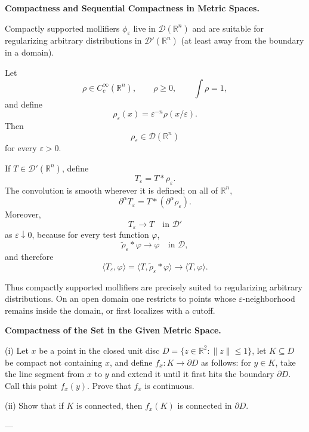 \begin{problem}[CP-II-0062]
\label{prob:cp-ii-0062}
\textbf{Compactness and Sequential Compactness in Metric Spaces.}

\hspace*{1.5em}Compactly supported mollifiers $\phi_\varepsilon$ live in
	$\mathcal{D}(\mathbb{R}^n)$ and are suitable for regularizing
	arbitrary distributions in $\mathcal{D}'(\mathbb{R}^n)$ (at least
	away from the boundary in a domain).
\end{problem}

\begin{solution}
Let
\[
\rho\in C_c^\infty(\mathbb R^n),
\qquad
\rho\ge0,
\qquad
\int\rho=1,
\]
and define
\[
\rho_\varepsilon(x)
=
\varepsilon^{-n}\rho(x/\varepsilon).
\]
Then
\[
\rho_\varepsilon\in\mathcal D(\mathbb R^n)
\]
for every \(\varepsilon>0\).

If \(T\in\mathcal D'(\mathbb R^n)\), define
\[
T_\varepsilon=T*\rho_\varepsilon.
\]
The convolution is smooth wherever it is defined; on all of \(\mathbb R^n\),
\[
\partial^\alpha T_\varepsilon
=
T*(\partial^\alpha\rho_\varepsilon).
\]
Moreover,
\[
T_\varepsilon\longrightarrow T
\quad\text{in }\mathcal D'
\]
as \(\varepsilon\downarrow0\), because for every test function \(\varphi\),
\[
\widetilde\rho_\varepsilon*\varphi
\longrightarrow
\varphi
\quad\text{in }\mathcal D,
\]
and therefore
\[
\langle T_\varepsilon,\varphi\rangle
=
\langle T,\widetilde\rho_\varepsilon*\varphi\rangle
\longrightarrow
\langle T,\varphi\rangle.
\]

Thus compactly supported mollifiers are precisely suited to regularizing arbitrary distributions. On an open domain one restricts to points whose \(\varepsilon\)-neighborhood remains inside the domain, or first localizes with a cutoff.
\end{solution}


\begin{problem}[CP-II-0069]
\label{prob:cp-ii-0069}
\textbf{Compactness of the Set in the Given Metric Space.}

\hspace*{1.5em}(i) Let $x$ be a point in the closed unit disc $D=\{z\in\mathbb{R}^2 : \|z\|\leq 1\}$, let $K\subseteq D$ be compact not containing $x$, and define $f_x:K\to \partial D$ as follows: for $y\in K$, take the line segment from $x$ to $y$ and extend it until it first hits the boundary $\partial D$. Call this point $f_x(y)$. Prove that $f_x$ is continuous.

(ii) Show that if $K$ is connected, then $f_x(K)$ is connected in $\partial D$.

---
\end{problem}

